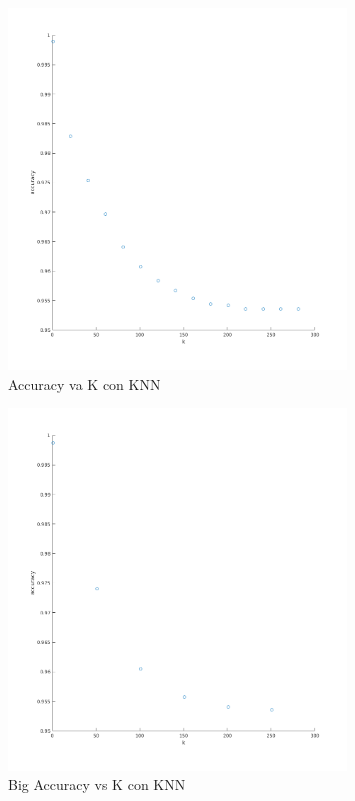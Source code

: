 \begin{figure}[H]
	\centering	\includegraphics[width=0.8\textwidth]{img/k_knn_accu.png}
	\caption{Accuracy va K con KNN}
	\label{fig:Accuracy vs K con KNN}
\end{figure}
\begin{figure}[H]
	\centering	\includegraphics[width=0.8\textwidth]{img/big_k_knn_accu.png}
	\caption{Big Accuracy vs K con KNN}
	\label{fig:Big Accuracy vs K con KNN}
\end{figure}






